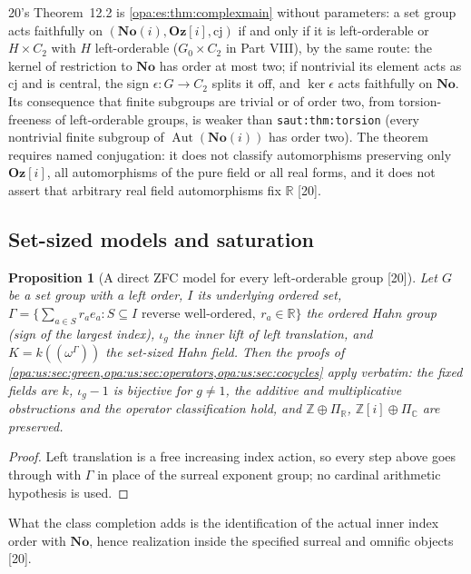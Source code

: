 \documentclass[11pt,oneside]{article}
\numberwithin{equation}{section}
\newtheorem{proposition}[proposition]{Proposition}
\theoremstyle{definition}
\theoremstyle{remark}
\newcommand{\No}{\mathbf{No}}
\newcommand{\Og}{\mathbf{Oz}[i]}
\newcommand{\SC}{\mathbf{No}(i)}
\newcommand{\R}{\mathbb R}
\newcommand{\C}{\mathbb C}
\newcommand{\Z}{\mathbb Z}
\newcommand{\Aut}{\operatorname{Aut}}
\newcommand{\src}[1]{\textup{\textsf{\small[#1]}}}
\newcommand{\lbl}[1]{\nolinkurl{#1}}
\begin{document}
20's Theorem~12.2 is \cref{opa:es:thm:complexmain} without parameters: a set group acts faithfully on $(\SC,\Og,\mathrm{cj})$ if and only if it is
left-orderable or $H\times C_2$ with $H$ left-orderable ($G_0\times C_2$ in Part VIII), by the same route: the kernel of restriction to $\No$ has order
at most two; if nontrivial its element acts as $\mathrm{cj}$ and is central, the sign $\epsilon:G\to C_2$ splits it off, and $\ker\epsilon$ acts faithfully
on $\No$. Its consequence that finite subgroups are trivial or of order two, from torsion-freeness of left-orderable groups, is weaker than
\lbl{saut:thm:torsion} (every nontrivial finite subgroup of $\Aut(\SC)$ has order two). The theorem requires named conjugation: it does not
classify automorphisms preserving only $\Og$, all automorphisms of the pure field or all real forms, and it does not assert that arbitrary real
field automorphisms fix $\R$ \src{20}.

\subsection{Set-sized models and saturation}

\begin{proposition}[A direct ZFC model for every left-orderable group \src{20}]\label{opa:us:prop:setmodel}
Let $G$ be a set group with a left order, $I$ its underlying ordered set, $\Gamma=\{\sum_{a\in S}r_ae_a:S\subseteq I\text{ reverse well-ordered},\ r_a\in\R\}$
the ordered Hahn group (sign of the largest index), $\iota_g$ the inner lift of left translation, and $K=k((\omega^\Gamma))$ the set-sized Hahn field.
Then the proofs of \cref{opa:us:sec:green,opa:us:sec:operators,opa:us:sec:cocycles} apply verbatim: the fixed fields are $k$, $\iota_g-1$ is bijective for
$g\ne1$, the additive and multiplicative obstructions and the operator classification hold, and $\Z\oplus\Pi_\R$, $\Z[i]\oplus\Pi_\C$ are preserved.
\end{proposition}
\begin{proof}
Left translation is a free increasing index action, so every step above goes through with $\Gamma$ in place of the surreal exponent group; no cardinal
arithmetic hypothesis is used.
\end{proof}

What the class completion adds is the identification of the actual inner index order with $\No$, hence realization inside the specified surreal and
omnific objects \src{20}.
\end{document}
